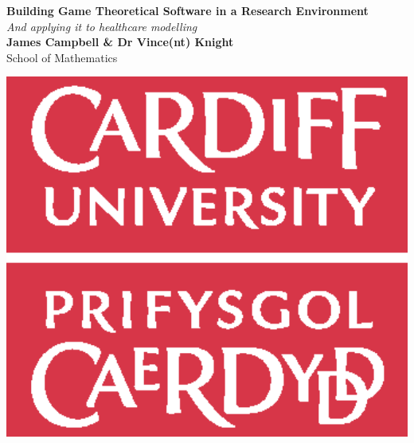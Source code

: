 \documentclass[a0,landscape]{a0poster}
\begin{document}
\begin{minipage}[b]{0.7\linewidth}
\veryHuge \color{NavyBlue} \textbf{Building Game Theoretical Software in a Research Environment} \color{Black}\\ %
\Huge\textit{And applying it to healthcare modelling}\\[1cm] %
\huge \textbf{James Campbell \& Dr Vince(nt) Knight}\\ %
\huge School of Mathematics\\ %
\end{minipage}
%
%
\begin{minipage}[b]{0.3\linewidth}
\centering
\includegraphics[width=15cm]{Images/logo.eps}
\end{minipage}
\end{document}
